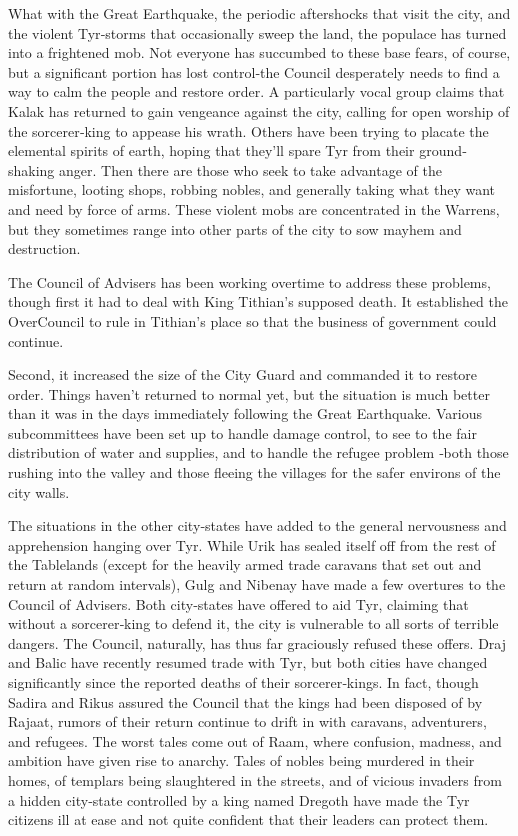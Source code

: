 {	What with the Great Earthquake, the periodic aftershocks that visit the city, and the violent Tyr‐storms that occasionally sweep the land, the populace has turned into a frightened mob. Not everyone has succumbed to these base fears, of course, but a significant portion has lost control‐the Council desperately needs to find a way to calm the people and restore order. A particularly vocal group claims that Kalak has returned to gain vengeance against the city, calling for open worship of the sorcerer‐king to appease his wrath. Others have been trying to placate the elemental spirits of earth, hoping that they’ll spare Tyr from their ground‐shaking anger. Then there are those who seek to take advantage of the misfortune, looting shops, robbing nobles, and generally taking what they want and need by force of arms. These violent mobs are concentrated in the Warrens, but they sometimes range into other parts of the city to sow mayhem and destruction.

	The Council of Advisers has been working overtime to address these problems, though first it had to deal with King Tithian’s supposed death. It established the OverCouncil to rule in Tithian’s place so that the business of government could continue.

	Second, it increased the size of the City Guard and commanded it to restore order. Things haven’t returned to normal yet, but the situation is much better than it was in the days immediately following the Great Earthquake. Various subcommittees have been set up to handle damage control, to see to the fair distribution of water and supplies, and to handle the refugee problem ‐both those rushing into the valley and those fleeing the villages for the safer environs of the city walls.

	The situations in the other city‐states have added to the general nervousness and apprehension hanging over Tyr. While Urik has sealed itself off from the rest of the Tablelands (except for the heavily armed trade caravans that set out and return at random intervals), Gulg and Nibenay have made a few overtures to the Council of Advisers. Both city‐states have offered to aid Tyr, claiming that without a sorcerer‐king to defend it, the city is vulnerable to all sorts of terrible dangers. The Council, naturally, has thus far graciously refused these offers. Draj and Balic have recently resumed trade with Tyr, but both cities have changed significantly since the reported deaths of their sorcerer‐kings. In fact, though Sadira and Rikus assured the Council that the kings had been disposed of by Rajaat, rumors of their return continue to drift in with caravans, adventurers, and refugees. The worst tales come out of Raam, where confusion, madness, and ambition have given rise to anarchy. Tales of nobles being murdered in their homes, of templars being slaughtered in the streets, and of vicious invaders from a hidden city‐state controlled by a king named Dregoth have made the Tyr citizens ill at ease and not quite confident that their leaders can protect them.

}
